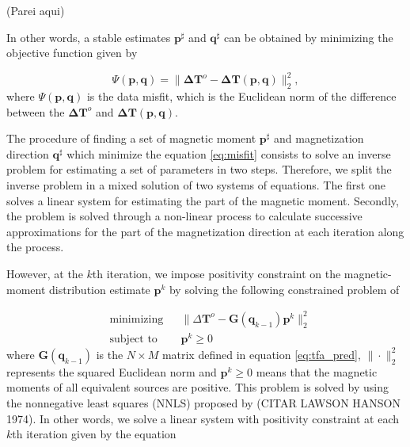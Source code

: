 (Parei aqui)

In other words, a stable estimates $\mathbf{p}^\sharp$ and $\mathbf{q}^\sharp$ can be obtained by minimizing the objective function given by

\begin{equation}
\Psi(\mathbf{p}, \mathbf{q}) =  \parallel \mathbf{\Delta T}^o - \mathbf{\Delta T} (\mathbf{p}, \mathbf{q}) \parallel_{2}^{2},
\label{eq:misfit}
\end{equation}
where $\Psi(\mathbf{p}, \mathbf{q})$ is the data misfit, which is the Euclidean norm of the difference between the $\mathbf{\Delta T}^o$ and $\mathbf{\Delta T} (\mathbf{p}, \mathbf{q})$.


The procedure of finding a set of magnetic moment $\mathbf{p}^\sharp$ and magnetization direction $\mathbf{q}^\sharp$ which minimize the equation \ref{eq:misfit} consists to solve an inverse problem for estimating a set of parameters in two steps. Therefore, we split the inverse problem in a mixed solution of two systems of equations. The first one solves a linear system for estimating the part of the magnetic moment. Secondly, the problem is solved through a non-linear process to calculate successive approximations for the part of the magnetization direction at each iteration along the process. 

However, at the $k$th iteration, we impose positivity constraint on the magnetic-moment distribution estimate $\mathbf{p}^k$ by solving the following constrained problem of

\begin{equation}
	\begin{aligned}
		& \text{minimizing}
		& &\lVert \Delta \mathbf{T}^o - \mathbf{G}(\mathbf{q}_{k-1}) \mathbf{p}^k \rVert_{2}^{2} \\
		& \text{subject to}
		& & \mathbf{p}^k \geqslant 0
	\end{aligned}
	\label{eq:positivity}
\end{equation}
where $\mathbf{G}(\mathbf{q}_{k-1})$ is the $N \times M$ matrix defined in equation \ref{eq:tfa_pred},
$\| \cdot \|_{2}^{2}$ represents the squared Euclidean norm and $\mathbf{p}^k \geqslant 0$ means that the magnetic moments of all equivalent sources are positive. This problem is solved by using the nonnegative least squares (NNLS) proposed by (CITAR LAWSON HANSON 1974). In other words, we solve a linear system with positivity constraint at each $k$th iteration given by the equation 

